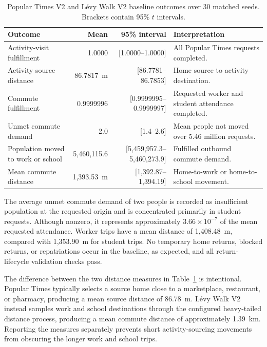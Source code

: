 \begin{table}[ht]
\centering
\footnotesize
\caption{Popular Times V2 and L\'evy Walk V2 baseline outcomes over 30 matched seeds. Brackets contain 95\% $t$ intervals.}
\label{tbl:levy_v2_baseline}
\begin{tabularx}{\linewidth}{@{}lrrX@{}}
\toprule
\textbf{Outcome} & \textbf{Mean} & \textbf{95\% interval} & \textbf{Interpretation} \\
\midrule
Activity-visit fulfillment
    & 1.0000 & [1.0000--1.0000]
    & All Popular Times requests completed. \\
Activity source distance
    & 86.7817~m & [86.7781--86.7853]
    & Home source to activity destination. \\
Commute fulfillment
    & 0.9999996 & [0.9999995--0.9999997]
    & Requested worker and student attendance completed. \\
Unmet commute demand
    & 2.0 & [1.4--2.6]
    & Mean people not moved over 5.46 million requests. \\
Population moved to work or school
    & 5,460,115.6 & [5,459,957.3--5,460,273.9]
    & Fulfilled outbound commute demand. \\
Mean commute distance
    & 1,393.53~m & [1,392.87--1,394.19]
    & Home-to-work or home-to-school movement. \\
\bottomrule
\end{tabularx}
\end{table}

The average unmet commute demand of two people is recorded as insufficient population at the requested origin and is concentrated primarily in student requests. Although nonzero, it represents approximately $3.66\times10^{-7}$ of the mean requested attendance. Worker trips have a mean distance of 1,408.48~m, compared with 1,353.90~m for student trips. No temporary home returns, blocked returns, or repatriations occur in the baseline, as expected, and all return-lifecycle validation checks pass.

The difference between the two distance measures in Table~\ref{tbl:levy_v2_baseline} is intentional. Popular Times typically selects a source home close to a marketplace, restaurant, or pharmacy, producing a mean source distance of 86.78~m. L\'evy Walk V2 instead samples work and school destinations through the configured heavy-tailed distance process, producing a mean commute distance of approximately 1.39~km. Reporting the measures separately prevents short activity-sourcing movements from obscuring the longer work and school trips.

